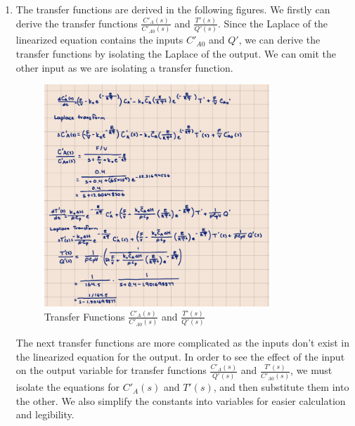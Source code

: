 \documentclass[12pt]{article}
\begin{document}
\begin{enumerate}
\begin{enumerate}
    \item 
    The transfer functions are derived in the following figures. We firstly can derive the transfer functions $\frac{C'_A(s)}{C'_{A0}(s)}$ and $\frac{T'(s)}{Q'(s)}$. Since the Laplace of the linearized equation contains the inputs $C'_{A0}$ and $Q'$, we can derive the transfer functions by isolating the Laplace of the output. We can omit the other input as we are isolating a transfer function.

    \begin{figure}[H]
      \centering
      \includegraphics[width=0.8\textwidth]{Figures/handcalc/figure4-4a.png}
      \caption{Transfer Functions $\frac{C'_A(s)}{C'_{A0}(s)}$ and $\frac{T'(s)}{Q'(s)}$}
      \label{fig:figure45}
    \end{figure}

    The next transfer functions are more complicated as the inputs don't exist in the linearized equation for the output. In order to see the effect of the input on the output variable for transfer functions $\frac{C'_A(s)}{Q'(s)}$ and $\frac{T'(s)}{C'_{A0}(s)}$, we must isolate the equations for $C'_A(s)$ and $T'(s)$, and then substitute them into the other. We also simplify the constants into variables for easier calculation and legibility.


\end{enumerate}
\end{enumerate}
\end{document}
